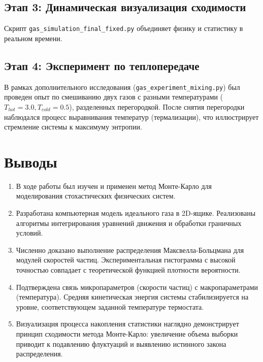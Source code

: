 \documentclass[12pt, a4paper]{article}
\begin{document}
	\subsection{Этап 3: Динамическая визуализация сходимости}
	Скрипт \texttt{gas\_simulation\_final\_fixed.py} объединяет физику и статистику в реальном времени. 
	
	\subsection{Этап 4: Эксперимент по теплопередаче}
	В рамках дополнительного исследования (\texttt{gas\_experiment\_mixing.py}) был проведен опыт по смешиванию двух газов с разными температурами ($T_{hot}=3.0, T_{cold}=0.5$), разделенных перегородкой. После снятия перегородки наблюдался процесс выравнивания температур (термализации), что иллюстрирует стремление системы к максимуму энтропии.
	
	\section{Выводы}
	
	\begin{enumerate}
		\item В ходе работы был изучен и применен метод Монте-Карло для моделирования стохастических физических систем.
		\item Разработана компьютерная модель идеального газа в 2D-ящике. Реализованы алгоритмы интегрирования уравнений движения и обработки граничных условий.
		\item Численно доказано выполнение распределения Максвелла-Больцмана для модулей скоростей частиц. Экспериментальная гистограмма с высокой точностью совпадает с теоретической функцией плотности вероятности.
		\item Подтверждена связь микропараметров (скорости частиц) с макропараметрами (температура). Средняя кинетическая энергия системы стабилизируется на уровне, соответствующем заданной температуре термостата.
		\item Визуализация процесса накопления статистики наглядно демонстрирует принцип сходимости метода Монте-Карло: увеличение объема выборки приводит к подавлению флуктуаций и выявлению истинного закона распределения.
	\end{enumerate}
	
\end{document}
